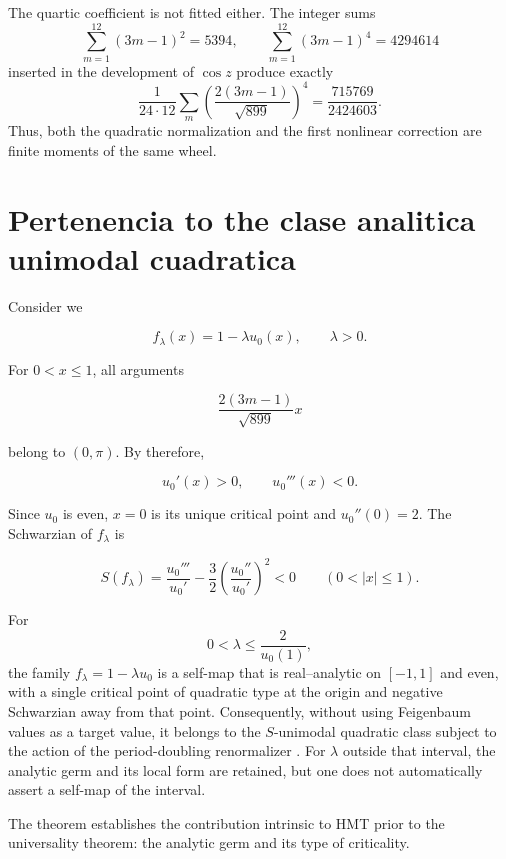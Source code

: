 The quartic coefficient is not fitted either. The integer sums
\begin{equation}
\sum_{m=1}^{12}(3m-1)^2=5394,\qquad
\sum_{m=1}^{12}(3m-1)^4=4294614
\label{mab:rm:eq:chaos-moments24}
\end{equation}
inserted in the development of \(\cos z\) produce exactly
\[
\frac1{24\cdot12}\sum_m
\left(\frac{2(3m-1)}{\sqrt{899}}\right)^4
=\frac{715769}{2424603}.
\]
Thus, both the quadratic normalization and the first nonlinear
correction are finite moments of the same wheel.

\section{Pertenencia to the clase analitica unimodal cuadratica}

Consider we

\[
f_\lambda(x)=1-\lambda u_0(x),\qquad \lambda>0.
\]

For \(0<x\le1\), all arguments

\[
\frac{2(3m-1)}{\sqrt{899}}x
\]

belong to \((0,\pi)\). By therefore,

\[
u_0'(x)>0,\qquad u_0'''(x)<0.
\]

Since \(u_0\) is even, \(x=0\) is its unique critical point and \(u_0''(0)=2\). The Schwarzian of \(f_\lambda\) is

\begin{equation}
S(f_\lambda)
=\frac{u_0'''}{u_0'}
-\frac32\left(\frac{u_0''}{u_0'}\right)^2<0
\qquad(0<|x|\le1).
\label{mab:rm:eq:negative-schwarzian}
\end{equation}

\begin{theorem}
For
\[
0<\lambda\le \frac{2}{u_0(1)},
\]
the family \(f_\lambda=1-\lambda u_0\) is a self-map that is real--analytic on \([-1,1]\) and even, with a single critical point of quadratic type at the origin and negative Schwarzian away from that point. Consequently, without using Feigenbaum values as a target value, it belongs to the \(S\)-unimodal quadratic class subject to the action of the period-doubling renormalizer \cite{rm:Feigenbaum1978,rm:Lanford1982}. For \(\lambda\) outside that interval, the analytic germ and its local form are retained, but one does not automatically assert a self-map of the interval.
\end{theorem}

The theorem establishes the contribution intrinsic to HMT prior to the
universality theorem: the analytic germ and its type of criticality.

